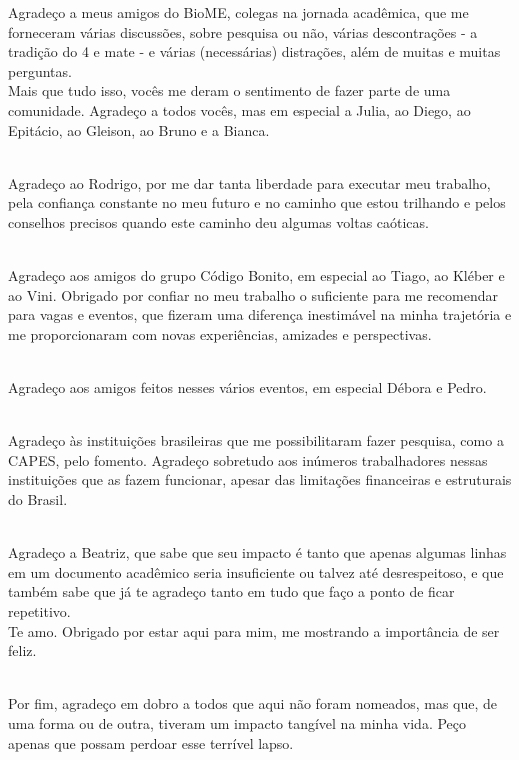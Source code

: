 \documentclass[
	12pt,				%
	oneside,			%
	a4paper,			%
	chapter=TITLE,		%
	section=TITLE,		%
	english,			%
	brazil				%
	]{abntex2}
\begin{document}
\begin{agradecimentos}
	Agradeço a meus amigos do BioME, colegas na jornada acadêmica, que me forneceram várias discussões, sobre pesquisa ou não, várias descontrações - a tradição do 4 e mate - e várias (necessárias) distrações, além de muitas e muitas perguntas.\\
Mais que tudo isso, vocês me deram o sentimento de fazer parte de uma comunidade. Agradeço a todos vocês, mas em especial a Julia, ao Diego, ao Epitácio, ao Gleison, ao Bruno e a Bianca.\\
\strut \\
Agradeço ao Rodrigo, por me dar tanta liberdade para executar meu trabalho, pela confiança constante no meu futuro e no caminho que estou trilhando e pelos conselhos precisos quando este caminho deu algumas voltas caóticas.\\
\strut \\
Agradeço aos amigos do grupo Código Bonito, em especial ao Tiago, ao Kléber e ao Vini. Obrigado por confiar no meu trabalho o suficiente para me recomendar para vagas e eventos, que fizeram uma diferença inestimável na minha trajetória e me proporcionaram com novas experiências, amizades e perspectivas.\\
\strut \\
Agradeço aos amigos feitos nesses vários eventos, em especial Débora e Pedro.\\
\strut \\
Agradeço às instituições brasileiras que me possibilitaram fazer pesquisa, como a CAPES, pelo fomento. Agradeço sobretudo aos inúmeros trabalhadores nessas instituições que as fazem funcionar, apesar das limitações financeiras e estruturais do Brasil.\\
\strut \\
Agradeço a Beatriz, que sabe que seu impacto é tanto que apenas algumas linhas em um documento acadêmico seria insuficiente ou talvez até desrespeitoso, e que também sabe que já te agradeço tanto em tudo que faço a ponto de ficar repetitivo.\\
Te amo. Obrigado por estar aqui para mim, me mostrando a importância de ser feliz.\\
\strut \\
Por fim, agradeço em dobro a todos que aqui não foram nomeados, mas que, de uma forma ou de outra, tiveram um impacto tangível na minha vida. Peço apenas que possam perdoar esse terrível lapso.
\end{agradecimentos}
\end{document}
